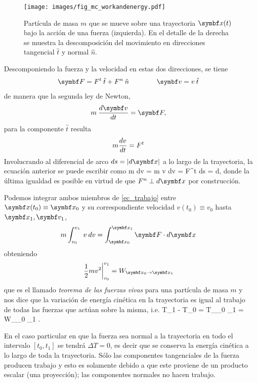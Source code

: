 \documentclass[10pt,oneside]{CBFT_book}
\begin{document}
\begin{figure}[!h]
	\begin{center}
	\texttt{[image: images/fig\_mc\_workandenergy.pdf]}	
	\end{center}
	\caption{Partícula de masa $m$ que se mueve sobre una trayectoria $\vb{x}(t)$ bajo la acción de una fuerza 
 (izquierda). En el detalle de la derecha se muestra la descomposición del movimiento en direcciones
tangencial $\hat{t}$ y normal $\hat{n}$.}
	\label{fig_mc_workenergy}
\end{figure} 

Descomponiendo la fuerza y la velocidad en estas dos direcciones, se tiene 
\[
	\vb{F} = F^t \: \hat{t}  + F^n \: \hat{n} \qquad \qquad \vb{v} = v \: \hat{t}
\]
de manera que la segunda ley de Newton, 
\[
	m \: \dtot{\vb{v}}{t} = \vb{F},
\]
para la componente $\hat{t}$ resulta
\[
	m \frac{d^{\hspace{-0.05em}} {v}}{d {t}^{\hspace{-0.05em}}} = F^t
\]
Involucrando al diferencial de arco $ ds = | d\vb{x} | $ a lo largo de la trayectoria, la ecuación anterior se
puede escribir como
\be
	m \: dv \: = m \: v \: dv = F^t \: ds =  \cdot d,
	\label{ec_trabajo}
\ee
donde la última igualdad es posible en virtud de que $ F^n \perp d\vb{x} $ por construcción.

Podemos integrar ambos miembros de \eqref{ec_trabajo} entre $\vb{x}(t_0) \equiv \vb{x}_0$ y su 
correspondiente velocidad $v(t_0) \equiv v_0$ hasta $\vb{x}_1, \vb{v}_1$, 
\[
	m \int_{v_0}^{v_1} \: v \: dv = \int_{\vb{x}_0}^{\vb{x}_1}  \vb{F} \cdot d\vb{x}
\]
obteniendo
\[
	\left. \frac{1}{2} m v^2 \right|_{v_0}^{v_1} = W_{\vb{x}_0 \to \vb{x}_1} 
\]
que es el llamado \emph{teorema de las fuerzas vivas} para una partícula de masa $m$ y nos dice que la
variación de energía cinética en la trayectoria es igual al trabajo de todas las fuerzas que actúan
sobre la misma, i.e.
\be
	T_1 - T_0 = \Delta T_{_0 \to {}_1}  = W_{_0 \to {}_1} .
	\label{conser_energia}
\ee

En el caso particular en que la fuerza sea normal a la trayectoria en todo el intervalo $[t_0,t_1]$ se 
tendrá $\Delta T = 0 $, es decir que se conserva la energía cinética a lo largo de toda la trayectoria.
Sólo las componentes tangenciales de la fuerza producen trabajo y esto es solamente debido a que este proviene
de un producto escalar (una proyección); las componentes normales no hacen trabajo.

\end{document}
